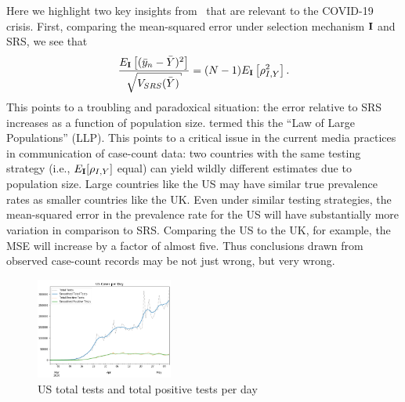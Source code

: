 \documentclass[aoas]{amsart}
\def\I{\bf I}
\begin{document}
Here we highlight two key insights from~\cite{Meng2018} that are relevant to the COVID-19 crisis.  First, comparing the mean-squared error under selection mechanism $\I$ and SRS, we see that
$$
\frac{E_{\I} \left[ (\bar y_n - \bar Y)^2 \right]}{\sqrt{V_{SRS} (\bar Y)}} = (N-1) E_{\I} \left[ \rho_{I,Y}^2 \right].
$$
This points to a troubling and paradoxical situation: the error relative to SRS increases as a function of population size.  \cite{Meng2018} termed this the ``Law of Large Populations'' (LLP).  This points to a critical issue in the current media practices in communication of case-count data: two countries with the same testing strategy (i.e., $E_{\I} [\rho_{I,Y} ]$ equal) can yield wildly different estimates due to population size.  Large countries like the US may have similar true prevalence rates as smaller countries like the UK.  Even under similar testing strategies, the mean-squared error in the prevalence rate for the US will have substantially more variation in comparison to SRS.  Comparing the US to the UK, for example, the MSE will increase by a factor of almost five.  Thus conclusions drawn from observed case-count records may be not just wrong, but very wrong.

\begin{figure}
\centering
\includegraphics[width = 0.4\textwidth]{../methods/figs/US-casecount.png}
\caption{US total tests and total positive tests per day}
\label{fig:ustests}
\vspace{-0.3cm}
\end{figure}
\end{document}
